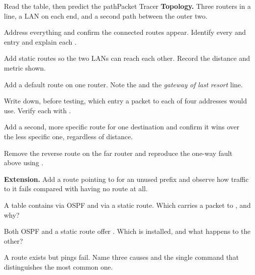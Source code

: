 \begin{lab}{Read the table, then predict the path}{Packet Tracer}
\textbf{Topology.} Three routers in a line, a LAN on each end, and a second path
between the outer two.

\begin{tasks}
  \item Address everything and confirm the connected routes appear. Identify
        every  and  entry and explain each .
  \item Add static routes so the two LANs can reach each other. Record the
        distance and metric shown.
  \item Add a default route on one router. Note the  and the
        \emph{gateway of last resort} line.
  \item Write down, before testing, which entry a packet to each of four
        addresses would use. Verify each with .
  \item Add a second, more specific route for one destination and confirm it wins
        over the less specific one, regardless of distance.
  \item Remove the reverse route on the far router and reproduce the one-way
        fault above using .
  \item \textbf{Extension.} Add a route pointing to  for an unused
        prefix and observe how traffic to it fails compared with having no route
        at all.
\end{tasks}
\end{lab}

\begin{checkpoint}
\begin{tightnum}
  \item A table contains  via OSPF and  via a
        static route. Which carries a packet to , and why?
  \item Both OSPF and a static route offer . Which is
        installed, and what happens to the other?
  \item A route exists but pings fail. Name three causes and the single command
        that distinguishes the most common one.
\end{tightnum}
\end{checkpoint}

